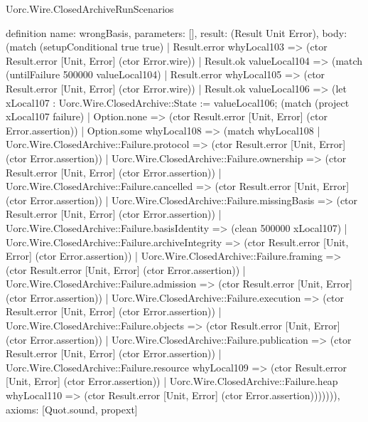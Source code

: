 \begin{lexlean}{Uorc.Wire.ClosedArchiveRunScenarios}
\begin{semanticmodule}
definition{
  name: wrongBasis,
  parameters: [],
  result: (Result Unit Error),
  body: (match (setupConditional true true)
    | Result.error whyLocal103 => (ctor Result.error [Unit, Error] (ctor Error.wire))
    | Result.ok valueLocal104 => (match (untilFailure 500000 valueLocal104)
      | Result.error whyLocal105 => (ctor Result.error [Unit, Error] (ctor Error.wire))
      | Result.ok valueLocal106 => (let xLocal107 : Uorc.Wire.ClosedArchive::State := valueLocal106; (match (project xLocal107 failure)
        | Option.none => (ctor Result.error [Unit, Error] (ctor Error.assertion))
        | Option.some whyLocal108 => (match whyLocal108
          | Uorc.Wire.ClosedArchive::Failure.protocol => (ctor Result.error [Unit, Error] (ctor Error.assertion))
          | Uorc.Wire.ClosedArchive::Failure.ownership => (ctor Result.error [Unit, Error] (ctor Error.assertion))
          | Uorc.Wire.ClosedArchive::Failure.cancelled => (ctor Result.error [Unit, Error] (ctor Error.assertion))
          | Uorc.Wire.ClosedArchive::Failure.missingBasis => (ctor Result.error [Unit, Error] (ctor Error.assertion))
          | Uorc.Wire.ClosedArchive::Failure.basisIdentity => (clean 500000 xLocal107)
          | Uorc.Wire.ClosedArchive::Failure.archiveIntegrity => (ctor Result.error [Unit, Error] (ctor Error.assertion))
          | Uorc.Wire.ClosedArchive::Failure.framing => (ctor Result.error [Unit, Error] (ctor Error.assertion))
          | Uorc.Wire.ClosedArchive::Failure.admission => (ctor Result.error [Unit, Error] (ctor Error.assertion))
          | Uorc.Wire.ClosedArchive::Failure.execution => (ctor Result.error [Unit, Error] (ctor Error.assertion))
          | Uorc.Wire.ClosedArchive::Failure.objects => (ctor Result.error [Unit, Error] (ctor Error.assertion))
          | Uorc.Wire.ClosedArchive::Failure.publication => (ctor Result.error [Unit, Error] (ctor Error.assertion))
          | Uorc.Wire.ClosedArchive::Failure.resource whyLocal109 => (ctor Result.error [Unit, Error] (ctor Error.assertion))
          | Uorc.Wire.ClosedArchive::Failure.heap whyLocal110 => (ctor Result.error [Unit, Error] (ctor Error.assertion))))))),
  axioms: [Quot.sound, propext]
}


\end{semanticmodule}
\end{lexlean}
